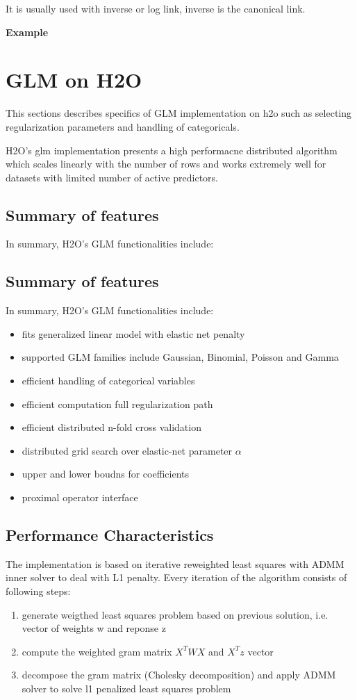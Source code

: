 \documentclass[11pt]{article}
\begin{document}
It is usually used with inverse or log link, inverse is the canonical link.

\textbf{Example}


\section{GLM on H2O}
This sections describes specifics of GLM implementation on h2o such as selecting regularization parameters and handling of categoricals. 

H2O's glm implementation presents a high performacne distributed algorithm which scales linearly with the number of rows and works extremely well for datasets with limited number of active predictors. 

\subsection{Summary of features} 
In summary, H2O's GLM functionalities include:

\subsection{Summary of features} 
In summary, H2O's GLM functionalities include:


\begin{itemize} 
\item fits generalized linear model with elastic net penalty
\item supported GLM families include Gaussian, Binomial, Poisson and Gamma
\item efficient handling of categorical variables
\item efficient computation full regularization path
\item efficient distributed n-fold cross validation
\item distributed grid search over elastic-net parameter $\alpha$
\item upper and lower boudns for coefficients
\item proximal operator interface
\end{itemize}

\subsection{Performance Characteristics}
The implementation is based on iterative reweighted least squares with ADMM inner solver to deal with L1 penalty. Every iteration of the algorithm consists of following steps:
\begin{enumerate} 
\item generate weigthed least squares problem based on previous solution, i.e. vector of weights w and reponse z 
\item compute the weighted gram matrix $X^TWX$ and $X^Tz$ vector
\item decompose the gram matrix (Cholesky decomposition) and apply ADMM solver to solve l1 penalized least squares problem
\end{enumerate}
\end{document}
